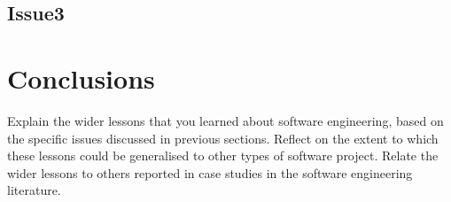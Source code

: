 \documentclass{l3proj}
\begin{document}

\subsection{Issue3}


\section{Conclusions}
Explain the wider lessons that you learned about software engineering,
based on the specific issues discussed in previous sections.  Reflect
on the extent to which these lessons could be generalised to other
types of software project.  Relate the wider lessons to others
reported in case studies in the software engineering literature.



\end{document}

